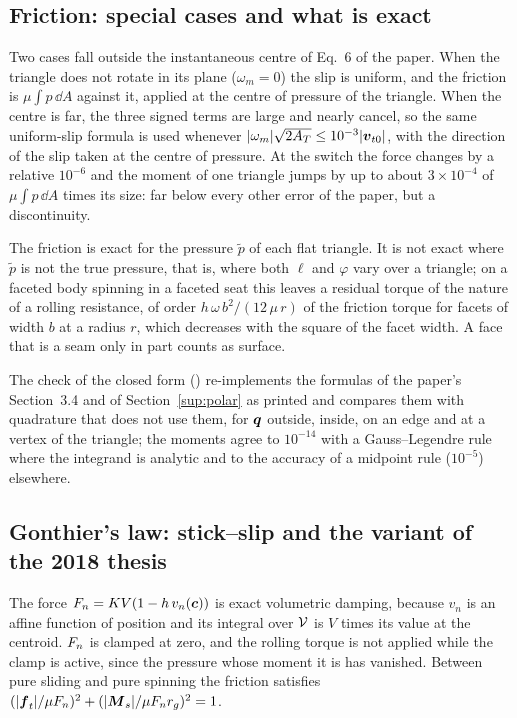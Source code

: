 \subsection{Friction: special cases and what is exact}\label{sup:friction-special}

Two cases fall outside the instantaneous centre of Eq.~6 of the paper. When the triangle does
not rotate in its plane ($\omega_m = 0$) the slip is uniform, and the friction is
$\mu\int p\,\dd A$ against it, applied at the centre of pressure of the triangle. When the
centre is far, the three signed terms are large and nearly cancel, so the same uniform-slip
formula is used whenever $|\omega_m|\sqrt{2A_T} \le 10^{-3}|\boldsymbol{v}_{t0}|$, with the direction of
the slip taken at the centre of pressure. At the switch the force changes by a relative
$10^{-6}$ and the moment of one triangle jumps by up to about $3\times10^{-4}$ of
$\mu\int p\,\dd A$ times its size: far below every other error of the paper, but a
discontinuity.

The friction is exact for the pressure $\tilde p$ of each flat triangle. It is not exact where
$\tilde p$ is not the true pressure, that is, where both $\ell$ and $\varphi$ vary over a
triangle; on a faceted body spinning in a faceted seat this leaves a residual torque of the
nature of a rolling resistance, of order $h\,\omega\,b^2/(12\,\mu\,r)$ of the friction torque
for facets of width $b$ at a radius $r$, which decreases with the square of the facet width. A
face that is a seam only in part counts as surface.

The check of the closed form () re-implements the
formulas of the paper's Section~3.4 and of Section~\ref{sup:polar} as printed and compares them with
quadrature that does not use them, for $\boldsymbol{q}$ outside, inside, on an edge and at a vertex of the
triangle; the moments agree to $10^{-14}$ with a Gauss--Legendre rule where the integrand is
analytic and to the accuracy of a midpoint rule ($10^{-5}$) elsewhere.

\subsection{Gonthier's law: stick--slip and the variant of the 2018 thesis}

The force $F_n = K V(1 - h\,v_n(\boldsymbol{c}))$ is exact volumetric damping, because $v_n$ is an
affine function of position and its integral over $\mathcal{V}$ is $V$ times its value at the
centroid. $F_n$ is clamped at zero, and the rolling torque is not applied while the clamp is
active, since the pressure whose moment it is has vanished. Between pure sliding and pure
spinning the friction satisfies
$(|\boldsymbol{f}_t|/\mu F_n)^2 + (|\boldsymbol{M}_s|/\mu F_n r_g)^2 = 1$.

